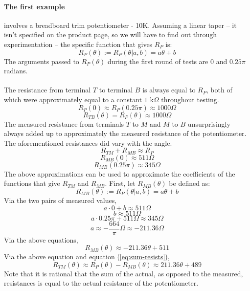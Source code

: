 \documentclass{article}
\begin{document}
	\paragraph[Example 1]{The first example} involves a breadboard trim potentiometer - 10K.  Assuming a linear taper -- it isn't specified on the product page, so we will have to find out through experimentation -- the specific function that gives $R_P$ is:
	$$ R_P(\theta) := R_P(\theta \vert a, b) = a \theta + b$$
	The arguments passed to $R_P(\theta)$ during the first round of tests are $0$ and $0.25\pi$ radians. \\ \\
	The resistance from terminal $T$ to terminal $B$ is always equal to $R_P$, both of which were approximately equal to a constant $1 \text{ k} \Omega$ throughout testing.
	$$ R_P(0) \approx R_P(0.25\pi) \approx 1000 \Omega$$
	$$ R_{TB}(\theta) = R_P(\theta) \approx 1000 \Omega$$
	The measured resistance from terminals $T$ to $M$ and $M$ to $B$ unsurprisingly always added up to approximately the measured resistance of the potentiometer.  The aforementioned resistances did vary with the angle.
	\begin{equation}\label{eq:sum-resists}
		R_{TM} + R_{MB} \approx R_P
	\end{equation}
	$$ R_{MB}(0) \approx 511 \Omega$$
	$$ R_{MB}(0.25\pi) \approx 345 \Omega$$
	The above approximations can be used to approximate the coefficients of the functions that give $R_{TM}$ and $R_{MB}$.  First, let $R_{MB}(\theta)$ be defined as:
	$$ R_{MB}(\theta) := R_P(\theta \vert a, b) = a\theta + b$$ 
	Via the two pairs of measured values,
	$$ a \cdot 0 + b \approx 511 \Omega$$
	$$ b \approx 511 \Omega$$
	$$ a \cdot 0.25\pi + 511 \Omega \approx 345 \Omega$$
	$$ a \approx - \frac{664}{\pi} \Omega \approx -211.36 \Omega$$
	Via the above equations,
	$$ R_{MB}(\theta) \approx -211.36 \theta + 511$$
	Via the above equation and equation (\ref{eq:sum-resists}),
	$$ R_{TM}(\theta) \approx R_P(\theta) - R_{MB}(\theta) \approx 211.36 \theta + 489 $$
	Note that it is rational that the sum of the actual, as opposed to the measured, resistances is equal to the actual resistance of the potentiometer. 
\end{document}

